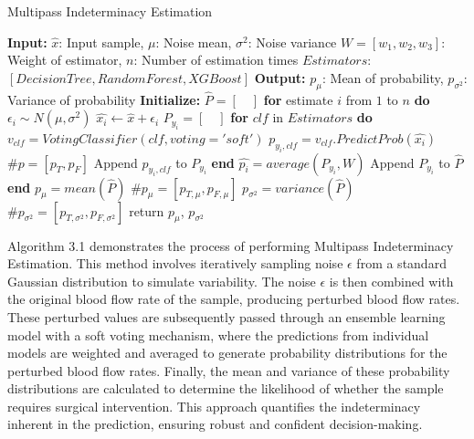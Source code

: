 \begin{algorithm}[H]
\caption{Multipass Indeterminacy Estimation}
\label{alg:Training}
\begin{algorithmic}[1]
\Statex \textbf{Input:} 
\Statex \hspace{1em} \(\hat{x}\): Input sample, \(\mu\): Noise mean, \(\sigma^2\): Noise variance
\Statex \hspace{1em} \(W=[w_{1},w_{2},w_{3}]\): Weight of estimator, \(n\): Number of estimation times
\Statex \hspace{1em} \(Estimators\): \([Decision Tree, Random Forest, XGBoost]\)
\Statex \textbf{Output:} 
\Statex \hspace{1em} \(p_{\mu}\): Mean of probability, \(p_{\sigma^2}\): Variance of probability
\Statex \textbf{Initialize:}
\Statex \hspace{1em} $\hat{P}=[\hspace{1em}]$
\State \textbf{for} estimate \(i\) from \(1\) to \(n\) \textbf{do}
\State \hspace{1em} \(\epsilon_{i} \sim N(\mu,\sigma^2)\) 
\State \hspace{1em} \(\hat{x_{i}} \leftarrow \hat{x} + \epsilon_{i} \)
\State \hspace{1em} \(P_{y_{i}} = [\hspace{1em}]\)
\State \hspace{1em} \textbf{for} \(clf\) in \(Estimators\) \textbf{do}
\State \hspace{2em} \(v_{clf} = VotingClassifier(clf, voting = 'soft')\)
\State \hspace{2em} \(p_{y_{i}, clf} = v_{clf}.PredictProb(\hat{x_{i}})\) \(\# p=[p_{T},p_{F}]\)
\State \hspace{2em} Append \(p_{y_{i}, clf}\) to \(P_{y_{i}}\)
\State \hspace{1em} \textbf{end}
\State \hspace{1em} \(\hat{p_{i}}=average(P_{y_{i}}, W)\)
\State \hspace{1em} Append \(P_{y_{i}}\) to \(\hat{P}\)
\State \textbf{end}
\State \(p_{\mu}=mean(\hat{P})\) \(\# p_{\mu}=[p_{T,\mu},p_{F,\mu}]\)
\State \(p_{\sigma^2}=variance(\hat{P})\) \(\# p_{\sigma^2}=[p_{T,\sigma^2},p_{F,\sigma^2}]\)
\State return \(p_{\mu}\), \(p_{\sigma^2}\)
\end{algorithmic}
\end{algorithm}

Algorithm 3.1 demonstrates the process of performing Multipass Indeterminacy Estimation. This method involves iteratively sampling noise \(\epsilon\) from a standard Gaussian distribution to simulate variability. The noise \(\epsilon\) is then combined with the original blood flow rate of the sample, producing perturbed blood flow rates. These perturbed values are subsequently passed through an ensemble learning model with a soft voting mechanism, where the predictions from individual models are weighted and averaged to generate probability distributions for the perturbed blood flow rates. Finally, the mean and variance of these probability distributions are calculated to determine the likelihood of whether the sample requires surgical intervention. This approach quantifies the indeterminacy inherent in the prediction, ensuring robust and confident decision-making.

